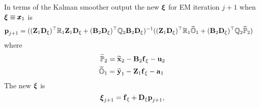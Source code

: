 \documentclass[]{article}
\def\xixi{\mbox{\boldmath $\xi$}}
\def\UPS{\mbox{\boldmath $\Upsilon$}}
\def\XI{\mbox{\boldmath $\Xi$}}
\def\BB{\mbox{$\mathbf B$}}	\def\bb{\mbox{$\mathbf b$}} \def\Bb{\mbox{$\mathbf J$}} \def\Ba{\mbox{$\mathbf L$}} \def\Bm{\UPS}
\def\DD{\mbox{$\mathbf D$}}	\def\dd{\mbox{$\mathbf d$}}
\def\ZZ{\mbox{$\mathbf Z$}}	\def\zz{\mbox{$\mathbf z$}}	\def\Zb{\mbox{$\mathbf M$}} \def\Za{\mbox{$\mathbf N$}} \def\Zm{\XI}
\begin{document}
In terms of the Kalman smoother output the new $\xixi$ for EM iteration $j+1$ when $\xixi \equiv \xx_1$ is
\begin{equation}\label{eq:pix1.unconstrained.V0.is.0.t.1.3}
\begin{split}
\pp_{j+1} &= ((\ZZ_1\DD_\xi)^\top\Rm_1\ZZ_1\DD_\xi + 
(\BB_2\DD_\xi)^\top\Qm_2\BB_2\DD_\xi)^{-1}
( (\ZZ_1\DD_\xi)^\top\Rm_1\widetilde{\mathbb{O}}_1 + (\BB_2\DD_\xi)^\top\Qm_2\widetilde{\mathbb{P}}_2)
\end{split}
\end{equation}
where
\begin{equation}
\begin{split}
\widetilde{\mathbb{P}}_2 &=\widetilde{\mbox{$\mathbf x$}}_2 - \BB_2\ff_\xi  - \uu_2\\
\widetilde{\mathbb{O}}_1 &=\widetilde{\mbox{$\mathbf y$}}_1 - \ZZ_1\ff_\xi  - \aa_1
\end{split}
\end{equation}
The new $\xixi$ is
\begin{equation}
\xixi_{j+1} = \ff_\xi + \DD_\xi\pp_{j+1},
\end{equation}
\end{document}
